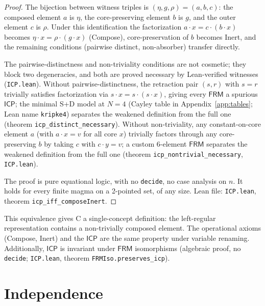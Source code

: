 \documentclass[sigconf,screen]{acmart}
\newcommand{\dotop}{\cdot}
\newcommand{\FRM}{\textsf{FRM}}
\newcommand{\ICP}{\textsf{ICP}}
\theoremstyle{remark}
\begin{document}
\begin{proof}
The bijection between witness triples is $(\eta, g, \rho) = (a, b, c)$: the composed element $a$ is $\eta$, the core-preserving element $b$ is $g$, and the outer element $c$ is $\rho$. Under this identification the factorization $a \dotop x = c \dotop (b \dotop x)$ becomes $\eta \dotop x = \rho \dotop (g \dotop x)$ (Compose), core-preservation of $b$ becomes Inert, and the remaining conditions (pairwise distinct, non-absorber) transfer directly.

The pairwise-distinctness and non-triviality conditions are not cosmetic; they block two degeneracies, and both are proved necessary by Lean-verified witnesses (\texttt{ICP.lean}). Without pairwise-distinctness, the retraction pair $(s, r)$ with $s = r$ trivially satisfies factorization via $s \dotop x = s \dotop (s \dotop x)$, giving every $\FRM$ a spurious $\ICP$; the minimal S{+}D model at $N\!=\!4$ (Cayley table in Appendix~\ref{app:tables}; Lean name \texttt{kripke4}) separates the weakened definition from the full one (theorem \texttt{icp\_distinct\_necessary}). Without non-triviality, any constant-on-core element $a$ (with $a \dotop x = v$ for all core $x$) trivially factors through any core-preserving $b$ by taking $c$ with $c \dotop y = v$; a custom 6-element $\FRM$ separates the weakened definition from the full one (theorem \texttt{icp\_nontrivial\_necessary}, \texttt{ICP.lean}).

The proof is pure equational logic, with no \texttt{decide}, no case analysis on $n$. It holds for every finite magma on a 2-pointed set, of any size. Lean file: \texttt{ICP.lean}, theorem \texttt{icp\_iff\_composeInert}.
\end{proof}

This equivalence gives C a single-concept definition: the left-regular representation contains a non-trivially composed element. The operational axioms (Compose, Inert) and the $\ICP$ are the same property under variable renaming. Additionally, $\ICP$ is invariant under $\FRM$ isomorphisms (algebraic proof, no \texttt{decide}; \texttt{ICP.lean}, theorem \texttt{FRMIso.preserves\_icp}).

\section{Independence}
\label{sec:independence}
\end{document}

